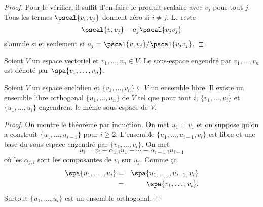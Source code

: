 \begin{proof}
  Pour le vérifier, il suffit d'en faire le produit scalaire avec $v_j$ pour tout $j$. Tous les termes $\pscal{v_i,v_j}$ donnent zéro si $i\neq j$. Le reste
  \begin{displaymath}
    \pscal{v,v_j} - a_j\pscal{v_jv_j}
  \end{displaymath}
s'annule si et seulement si $a_j = \pscal{v,v_j}/\pscal{v_jv_j}$. 
\end{proof}



\begin{notation}
  Soient $V$ un espace vectoriel et $v_1,\dots,v_n \in V$. Le sous-espace engendré par $v_1,\dots,v_n$ est dénoté par  $\spa\{v_1,\dots,v_n\}$. 
\end{notation}



\begin{theorem}
  \label{thr:2}
  Soient $V$ un espace euclidien et  $\{v_1,\dots,v_n\} \subseteq V$
  un ensemble libre.  
  Il existe un ensemble libre orthogonal $\{u_1,\dots,u_n\}$
  de $V$
  tel que pour tout $i$, 
  $\{v_1,\dots,v_i\}$
  et $\{u_1,\dots,u_i\}$ engendrent le même sous-espace de $V$.
\end{theorem}


\begin{proof}
  On montre le théorème par induction.  On met $u_1 = v_1$
  et on suppose qu'on a construit $\{u_1,\dots,u_{i-1}\}$
  pour $i \geq 2$.
  L'ensemble $\{u_1,\dots,u_{i-1},v_i\}$
  est libre et une base du sous-espace engendré
  par $\{v_1,\dots,v_i\}$.
  On met  
  \begin{displaymath}
    u_i = v_i - \alpha_{1,i}  u_1 - \cdots - \alpha_{i-1,i} u_{i-1}
  \end{displaymath}
  où les $\alpha_{j,i}$
  sont les composantes de $v_i$
  sur $u_j$.
  Comme ça 
  \begin{eqnarray*}
    \spa \{u_1,\dots,u_i\} & = & \spa\{u_1,\dots,u_{i-1},v_i\} \\
                           &=  &\spa\{v_1,\dots,v_i\}.
  \end{eqnarray*}
  Surtout $\{u_1,\dots,u_i\}$ est un ensemble orthogonal.  
\end{proof}



